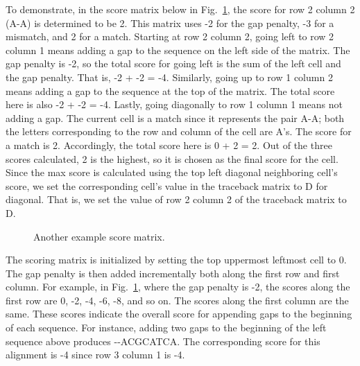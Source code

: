 \documentclass[conference]{IEEEtran}
\begin{document}
To demonstrate, in the score matrix below in Fig.~\ref{6}, the score for row 2 column 2 (A-A) is determined to be 2. This matrix uses -2 for the gap penalty, -3 for a mismatch, and 2 for a match. Starting at row 2 column 2, going left to row 2 column 1 means adding a gap to the sequence on the left side of the matrix. The gap penalty is -2, so the total score for going left is the sum of the left cell and the gap penalty. That is, -2 + -2 = -4. Similarly, going up to row 1 column 2 means adding a gap to the sequence at the top of the matrix. The total score here is also -2 + -2 = -4. Lastly, going diagonally to row 1 column 1 means not adding a gap. The current cell is a match since it represents the pair A-A; both the letters corresponding to the row and column of the cell are A’s. The score for a match is 2. Accordingly, the total score here is 0 + 2 = 2. Out of the three scores calculated, 2 is the highest, so it is chosen as the final score for the cell. Since the max score is calculated using the top left diagonal neighboring cell’s score, we set the corresponding cell’s value in the traceback matrix to D for diagonal. That is, we set the value of row 2 column 2 of the traceback matrix to D.

\begin{figure}[htbp]
\centerline{}
\caption{Another example score matrix. \cite{musso}}
\label{6}
\end{figure}

The scoring matrix is initialized by setting the top uppermost leftmost cell to 0. The gap penalty is then added incrementally both along the first row and first column. For example, in Fig.~\ref{6}, where the gap penalty is -2, the scores along the first row are 0, -2, -4, -6, -8, and so on. The scores along the first column are the same. These scores indicate the overall score for appending gaps to the beginning of each sequence. For instance, adding two gaps to the beginning of the left sequence above produces -{}-ACGCATCA. The corresponding score for this alignment is -4 since row 3 column 1 is -4.
\end{document}

